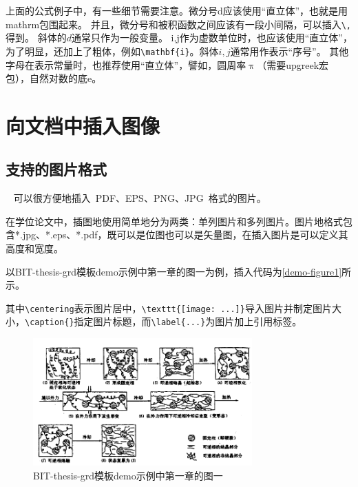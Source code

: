 上面的公式例子中，有一些细节需要注意。微分号d应该使用``直立体''，也就是用mathrm包围起来。
并且，微分号和被积函数之间应该有一段小间隔，可以插入\verb+\,+得到。
斜体的$d$通常只作为一般变量。
i,j作为虚数单位时，也应该使用``直立体''，为了明显，还加上了粗体，例如\verb+\mathbf{i}+。斜体$i,j$通常用作表示``序号''。
其他字母在表示常量时，也推荐使用``直立体''，譬如，圆周率$\uppi$（需要upgreek宏包），自然对数的底$\mathrm{e}$。


\section{向文档中插入图像}
\label{sec:insertimage}

\subsection{支持的图片格式}
\label{sec:imageformat}

\XeTeX~ 可以很方便地插入~PDF、EPS、PNG、JPG~格式的图片。

在学位论文中，插图地使用简单地分为两类：单列图片和多列图片。图片地格式包含*.jpg、*.eps、*.pdf，既可以是位图也可以是矢量图，在插入图片是可以定义其高度和宽度。

以BIT-thesis-grd模板demo示例中第一章的图一为例，插入代码为\ref{demo-figure1}所示。

其中\verb+\centering+表示图片居中，\verb+\texttt{[image: ...]}+导入图片并制定图片大小，\verb+\caption{}+指定图片标题，而\verb+\label{...}+为图片加上引用标签。

\begin{figure}
 \centering
 \includegraphics[width=0.75\textwidth]{figures/figure1}
 \caption{BIT-thesis-grd模板demo示例中第一章的图一}\label{fig:diagram}
\end{figure}

